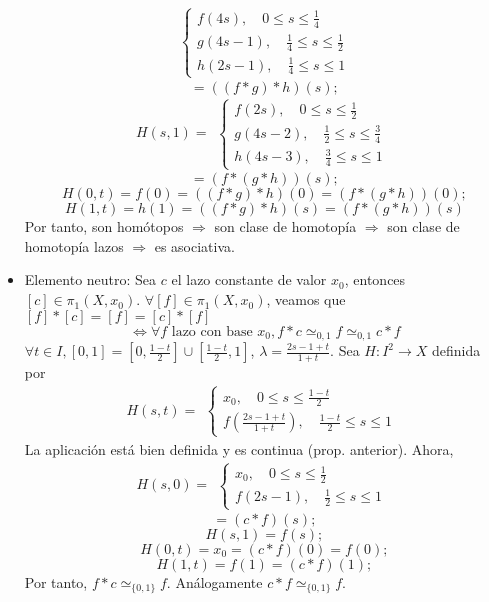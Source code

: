 \begin{dem}
\begin{itemize}
\[\begin{aligned}
        \begin{cases}
          f(4s), \quad 0 \leq s \leq \frac{1}{4} \\
          g(4s - 1), \quad \frac{1}{4} \leq s \leq \frac{1}{2} \\
          h(2s - 1), \quad \frac{1}{4} \leq s \leq 1
        \end{cases}
      \end{aligned}  
    \] 
    \[ 
      = ((f * g) * h)(s);
    \] 
    \[ 
      H(s,1) =
      \begin{aligned}
        \begin{cases}
          f(2s), \quad 0 \leq s \leq \frac{1}{2} \\
          g(4s - 2), \quad \frac{1}{2} \leq s \leq \frac{3}{4} \\
          h(4s - 3), \quad \frac{3}{4} \leq s \leq 1
        \end{cases}
      \end{aligned} 
    \] 
    \[ 
      = (f * (g * h))(s) ;
    \] 
    \[ 
      H(0, t) = f(0) = ((f * g) * h)(0) = (f * (g * h))(0) ;
    \] 
    \[ 
      H(1, t) = h(1) = ((f * g) * h)(s) = (f * (g * h))(s)
    \] 
    Por tanto, son homótopos $\Rightarrow$ son clase de homotopía $\Rightarrow$ son clase de homotopía lazos $\Rightarrow$ es asociativa.
    
  \item Elemento neutro: Sea $c$ el lazo constante de valor $x_{0}$, entonces $[c] \in \pi_{1}(X, x_{0})$. $\forall [f] \in \pi_{1}(X, x_{0})$, veamos que $[f] * [c] = [f]  = [c] * [f]$
    \[
      \Leftrightarrow \forall f \text{ lazo con base } x_{0}, f * c \simeq_{0, 1} f \simeq_{0, 1} c * f
    \]
    $\forall t \in I, [0, 1] = [0, \frac{1 - t}{2}] \cup [\frac{1 - t}{2}, 1]$, $\lambda = \frac{2s - 1 + t}{1 + t}$. Sea $H : I^{2} \to X$ definida por 
    \[ 
      H(s,t) =
      \begin{aligned}
        \begin{cases}
          x_{0}, \quad 0 \leq s \leq \frac{1 - t}{2} \\
          f(\frac{2s - 1 + t}{1 + t}), \quad \frac{1 - t}{2} \leq s \leq 1
        \end{cases}
      \end{aligned} 
    \] 
    La aplicación está bien definida y es continua (prop. anterior). Ahora,
    \[ 
      H(s,0) =
      \begin{aligned}
        \begin{cases}
          x_{0}, \quad 0 \leq s \leq \frac{1}{2} \\
          f(2s - 1), \quad \frac{1}{2} \leq s \leq 1
        \end{cases}
      \end{aligned} 
    \] 
    \[ 
      = (c * f)(s) ;
    \] 
    \[ 
      H(s,1) = f(s);
    \] 
    \[ 
      H(0,t) = x_{0} = (c * f)(0) = f(0);
    \] 
    \[ 
      H(1, t) = f(1) = (c * f)(1);
    \] 
    Por tanto, $f * c \simeq_{\{ 0,1 \}}f$. Análogamente $c * f \simeq_{\{ 0,1 \}} f$.
    

\end{itemize}
\end{dem}
